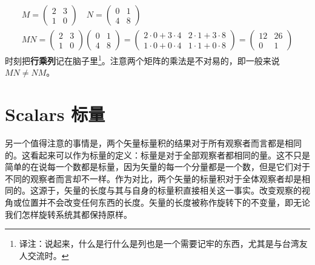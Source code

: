 
\begin{equation}
\begin{aligned}
M= \begin{pmatrix}
2 & 3 \\ 1 & 0
\end{pmatrix} \quad N =
\begin{pmatrix}
0 & 1 \\ 4 & 8
\end{pmatrix} \\
MN = \begin{pmatrix}
2 & 3 \\ 1 & 0
\end{pmatrix}
\begin{pmatrix}
0 & 1 \\ 4 & 8
\end{pmatrix} =
\begin{pmatrix}
2\cdot 0+3\cdot 4 & 2\cdot 1+3\cdot 8 \\ 1\cdot 0+0\cdot 4 & 1\cdot 1+0\cdot 8
\end{pmatrix} =
\begin{pmatrix}
12 & 26 \\ 0 & 1
\end{pmatrix}
\end{aligned}
\end{equation}
时刻把{\bf 行乘列}记在脑子里\footnote{译注：说起来，什么是行什么是列也是一个需要记牢的东西，尤其是与台湾友人交流时。}。注意两个矩阵的乘法是不对易的，即一般来说$MN\ne NM$。

\section[标量]{Scalars 标量}\label{appendix.A.4}
另一个值得注意的事情是，两个矢量标量积的结果对于所有观察者而言都是相同的。这看起来可以作为标量的定义：标量是对于全部观察者都相同的量。这不只是简单的在说每一个数都是标量，因为矢量的每一个分量都是一个数，但是它们对于不同的观察者而言却不一样。作为对比，两个矢量的标量积对于全体观察者却是相同的。这源于，矢量的长度与其与自身的标量积直接相关这一事实。改变观察的视角或位置并不会改变任何东西的长度。矢量的长度被称作旋转下的不变量，即无论我们怎样旋转系统其都保持原样。

